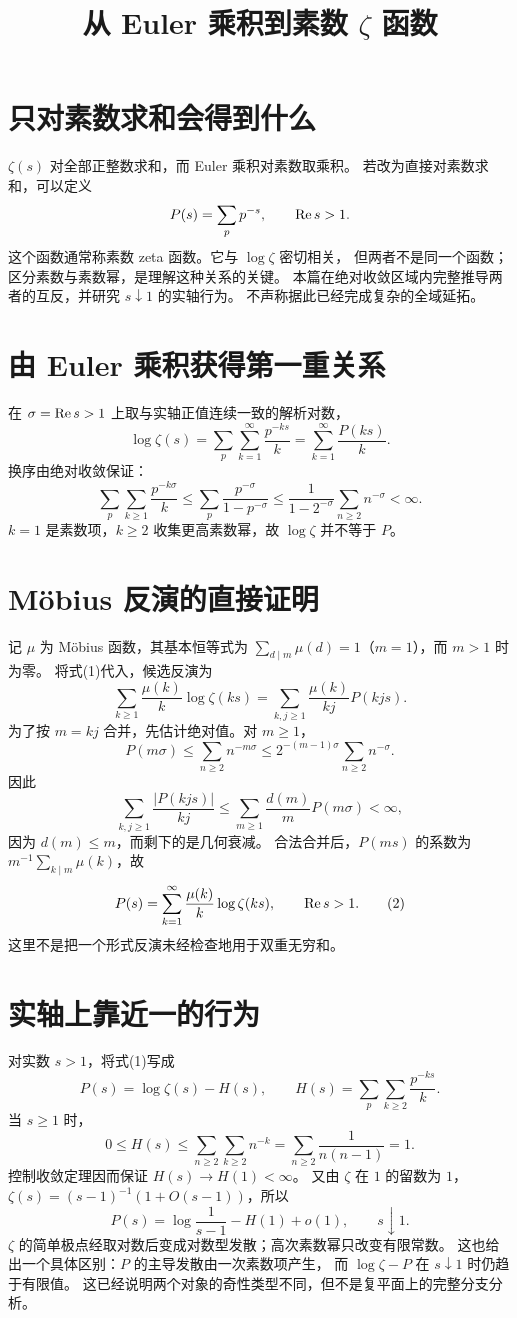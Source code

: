 \documentclass[UTF8,fontset=fandol,11pt]{ctexart}
\title{从 Euler 乘积到素数 $\zeta$ 函数}
\begin{document}
\maketitle
\draftnotice
\section{只对素数求和会得到什么}
$\zeta(s)$ 对全部正整数求和，而 Euler 乘积对素数取乘积。
若改为直接对素数求和，可以定义
\[
 P(s)=\sum_p p^{-s},\qquad \operatorname{Re} s>1.
\]
这个函数通常称素数 zeta 函数。它与 $\log\zeta$ 密切相关，
但两者不是同一个函数；区分素数与素数幂，是理解这种关系的关键。
本篇在绝对收敛区域内完整推导两者的互反，并研究 $s\downarrow1$ 的实轴行为。
不声称据此已经完成复杂的全域延拓。

\section{由 Euler 乘积获得第一重关系}
在 $\sigma=\operatorname{Re} s>1$ 上取与实轴正值连续一致的解析对数，
\[
 \log\zeta(s)=\sum_p\sum_{k=1}^\infty\frac{p^{-ks}}k
            =\sum_{k=1}^\infty\frac{P(ks)}k.                \tag{1}
\]
换序由绝对收敛保证：
\[
 \sum_p\sum_{k\ge1}\frac{p^{-k\sigma}}k
 \le\sum_p\frac{p^{-\sigma}}{1-p^{-\sigma}}
 \le\frac1{1-2^{-\sigma}}\sum_{n\ge2}n^{-\sigma}<\infty.
\]
$k=1$ 是素数项，$k\ge2$ 收集更高素数幂，故 $\log\zeta$ 并不等于 $P$。

\section{Möbius 反演的直接证明}
记 $\mu$ 为 Möbius 函数，其基本恒等式为
$\sum_{d\mid m}\mu(d)=1$（$m=1$），而 $m>1$ 时为零。
将式(1)代入，候选反演为
\[
 \sum_{k\ge1}\frac{\mu(k)}k\log\zeta(ks)
 =\sum_{k,j\ge1}\frac{\mu(k)}{kj}P(kjs).
\]
为了按 $m=kj$ 合并，先估计绝对值。对 $m\ge1$，
\[
 P(m\sigma)\le
 \sum_{n\ge2}n^{-m\sigma}
 \le 2^{-(m-1)\sigma}\sum_{n\ge2}n^{-\sigma}.
\]
因此
\[
 \sum_{k,j\ge1}\frac{|P(kjs)|}{kj}
 \le\sum_{m\ge1}\frac{d(m)}m P(m\sigma)<\infty,
\]
因为 $d(m)\le m$，而剩下的是几何衰减。
合法合并后，$P(ms)$ 的系数为
$m^{-1}\sum_{k\mid m}\mu(k)$，故
\[
 P(s)=\sum_{k=1}^\infty\frac{\mu(k)}k\log\zeta(ks),
 \qquad\operatorname{Re} s>1.                                        \tag{2}
\]
这里不是把一个形式反演未经检查地用于双重无穷和。

\section{实轴上靠近一的行为}
对实数 $s>1$，将式(1)写成
\[
 P(s)=\log\zeta(s)-H(s),\qquad
 H(s)=\sum_p\sum_{k\ge2}\frac{p^{-ks}}k.
\]
当 $s\ge1$ 时，
\[
 0\le H(s)\le\sum_{n\ge2}\sum_{k\ge2}n^{-k}
 =\sum_{n\ge2}\frac1{n(n-1)}=1.
\]
控制收敛定理因而保证 $H(s)\to H(1)<\infty$。
又由 $\zeta$ 在 $1$ 的留数为 $1$，
$\zeta(s)=(s-1)^{-1}(1+O(s-1))$，所以
\[
 P(s)=\log\frac1{s-1}-H(1)+o(1),\qquad s\downarrow1.
\]
$\zeta$ 的简单极点经取对数后变成对数型发散；高次素数幂只改变有限常数。
这也给出一个具体区别：$P$ 的主导发散由一次素数项产生，
而 $\log\zeta-P$ 在 $s\downarrow1$ 时仍趋于有限值。
这已经说明两个对象的奇性类型不同，但不是复平面上的完整分支分析。
\end{document}
